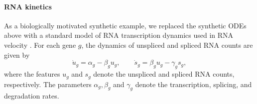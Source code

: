 \documentclass{article}
\theoremstyle{remark}
\theoremstyle{plain}
\begin{document}



\paragraph{RNA kinetics}
As a biologically motivated synthetic example, we replaced the synthetic ODEs above with a standard model of RNA transcription dynamics used in RNA velocity \cite{lamanno2018rna}. For each gene \(g\), the dynamics of unspliced and spliced RNA counts are given by
\begin{equation} \label{rna-velocity-eqn}
    \dot{u}_g = \alpha_g - \beta_g u_g, \qquad
    \dot{s}_g = \beta_g u_g - \gamma_g s_g,
\end{equation}
where the features $u_g$ and $s_g$ denote the unspliced and spliced RNA counts, respectively. The parameters $\alpha_g, \beta_g$ and $\gamma_g$ denote the transcription, splicing, and degradation rates.
\end{document}
